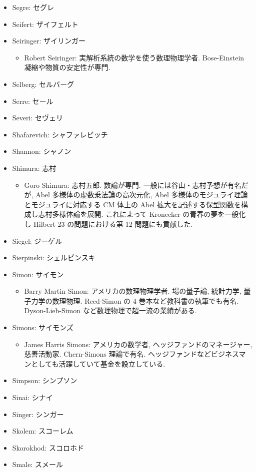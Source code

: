 \documentclass[openany, a4paper, oneside]{jsbook}
\begin{document}
\begin{itemize}
\item Segre: セグレ
\item Seifert: ザイフェルト
\item Seiringer: ザイリンガー
\begin{itemize}
\item Robert Seiringer: 実解析系統の数学を使う数理物理学者. Bose-Einstein 凝縮や物質の安定性が専門.
\end{itemize}
\item Selberg: セルバーグ
\item Serre: セール
\item Severi: セヴェリ
\item Shafarevich: シャファレビッチ
\item Shannon: シャノン
\item Shimura: 志村
\begin{itemize}
\item Goro Shimura: 志村五郎. 数論が専門. 一般には谷山・志村予想が有名だが, Abel 多様体の虚数乗法論の高次元化, Abel 多様体のモジュライ理論とモジュライに対応する CM 体上の Abel 拡大を記述する保型関数を構成し志村多様体論を展開. これによって Kronecker の青春の夢を一般化し Hilbert 23 の問題における第 12 問題にも貢献した.
\end{itemize}
\item Siegel: ジーゲル
\item Sierpinski: シェルピンスキ
\item Simon: サイモン
\begin{itemize}
\item Barry Martin Simon: アメリカの数理物理学者. 場の量子論, 統計力学, 量子力学の数理物理. Reed-Simon の 4 巻本など教科書の執筆でも有名. Dyson-Lieb-Simon など数理物理で超一流の業績がある.
\end{itemize}
\item Simons: サイモンズ
\begin{itemize}
\item James Harris Simons: アメリカの数学者, ヘッジファンドのマネージャー, 慈善活動家. Chern-Simons 理論で有名. ヘッジファンドなどビジネスマンとしても活躍していて基金を設立している.
\end{itemize}
\item Simpson: シンプソン
\item Sinai: シナイ
\item Singer: シンガー
\item Skolem: スコーレム
\item Skorokhod: スコロホド
\item Smale: スメール

\end{itemize}
\end{document}
